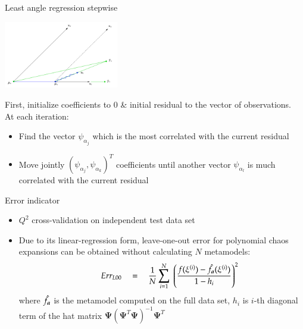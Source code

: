 \documentclass[9pt]{beamer}
\begin{document}
\begin{frame}{Least angle regression stepwise}

\begin{center}
 \includegraphics[width=5cm]{../Pics/lars.png} \\
 \color{cornellred}{Least angle regression stepwise}
\end{center}

First, initialize coefficients to $0$ \& initial residual to the vector of observations.\\

At each iteration:
\begin{itemize}
	\item Find the vector $\psi_{\alpha_j}$ which is the most correlated with the current residual
    \item Move jointly $(\psi_{\alpha_j}, \psi_{\alpha_k})^T$ coefficients until another vector $\psi_{\alpha_l}$ is much correlated with the current residual
\end{itemize}
\end{frame}



\begin{frame}[t]{Error indicator}
\begin{itemize}
\item $Q^2$ cross-validation on independent test data set
\item Due to its linear-regression form, leave-one-out error for polynomial chaos expansions can be obtained without calculating $N$ metamodels:
$$  \qquad Err_{L00} \quad = \quad \frac{1}{N} \sum_{i=1}^{N} \; \left( \frac{ f(\xi^{(i)}) - \hat{f}_{\boldsymbol a}(\xi^{(i)}) } {1 - h_i} \right)^2  $$ 
where $\hat{f}_{\boldsymbol a}$ is the metamodel computed on the full data set, $h_i$ is $i$-th diagonal term of the hat matrix $\boldsymbol{\Psi} \left( \boldsymbol{\Psi}^T \boldsymbol{\Psi} \right)^{-1} \boldsymbol{\Psi}^T$

\end{itemize}





\end{frame}
\end{document}

